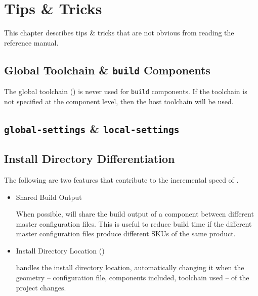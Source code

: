 %
%
%
%
\chapter{Tips \& Tricks}

This chapter describes tips \& tricks that are not obvious from
reading the reference manual.

\section{Global Toolchain \& \texttt{build} Components}

The global toolchain () is never used for
\texttt{build} components.  If the toolchain is not specified at the
component level, then the host toolchain will be used.

\section{\texttt{global-settings} \& \texttt{local-settings}}


\section{Install Directory Differentiation}\label{tips:install-directory}

The following are two features that contribute to the incremental
speed of \lmsbw.

\begin{itemize}
\item Shared Build Output

  When possible, \lmsbw will share the build output of a component
  between different master configuration files.  This is useful to
  reduce build time if the different master configuration files
  produce different SKUs of the same product.

\item Install Directory Location ()

  \lmsbw handles the install directory location, automatically
  changing it when the geometry -- configuration file, components
  included, toolchain used -- of the project changes.

\end{itemize}

